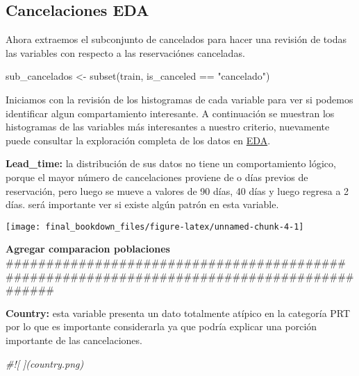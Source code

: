 \documentclass[
]{book}
\newenvironment{Shaded}{\begin{snugshade}}{\end{snugshade}}
\newcommand{\CommentTok}[1]{\textcolor[rgb]{0.56,0.35,0.01}{\textit{#1}}}
\newcommand{\FunctionTok}[1]{\textcolor[rgb]{0.00,0.00,0.00}{#1}}
\newcommand{\NormalTok}[1]{#1}
\newcommand{\OtherTok}[1]{\textcolor[rgb]{0.56,0.35,0.01}{#1}}
\newcommand{\SpecialCharTok}[1]{\textcolor[rgb]{0.00,0.00,0.00}{#1}}
\newcommand{\StringTok}[1]{\textcolor[rgb]{0.31,0.60,0.02}{#1}}
\begin{document}
\hypertarget{cancelaciones-eda}{%
\subsection{Cancelaciones EDA}\label{cancelaciones-eda}}

Ahora extraemos el subconjunto de cancelados para hacer una revisión de todas las variables con respecto a las reservaciónes canceladas.

\begin{Shaded}
\begin{Highlighting}[]
\NormalTok{sub\_cancelados }\OtherTok{\textless{}{-}} \FunctionTok{subset}\NormalTok{(train, is\_canceled }\SpecialCharTok{==} \StringTok{"cancelado"}\NormalTok{)}
\end{Highlighting}
\end{Shaded}

Iniciamos con la revisión de los histogramas de cada variable para ver si podemos identificar algun compartamiento interesante. A continuación se muestran los histogramas de las variables más interesantes a nuestro criterio, nuevamente puede consultar la exploración completa de los datos en \href{https://github.com/marcoyel21/hotel_cancelation_ML21/blob/main/final/EDA_Cancelaciones.Rmd}{EDA}.

\textbf{Lead\_time:} la distribución de sus datos no tiene un comportamiento lógico, porque el mayor número de cancelaciones proviene de o días previos de reservación, pero luego se mueve a valores de 90 días, 40 días y luego regresa a 2 días. será importante ver si existe algún patrón en esta variable.

\begin{center}\texttt{[image: final\_bookdown\_files/figure-latex/unnamed-chunk-4-1]} \end{center}

\textbf{Agregar comparacion poblaciones} \#\#\#\#\#\#\#\#\#\#\#\#\#\#\#\#\#\#\#\#\#\#\#\#\#\#\#\#\#\#\#\#\#\#\#\#\#\#\#\#\#\#
\#\#\#\#\#\#\#\#\#\#\#\#\#\#\#\#\#\#\#\#\#\#\#\#\#\#\#\#\#\#\#\#\#\#\#\#\#\#\#\#\#\#\#\#\#\#\#\#\#

\textbf{Country:} esta variable presenta un dato totalmente atípico en la categoría PRT por lo que es importante considerarla ya que podría explicar una porción importante de las cancelaciones.

\begin{Shaded}
\begin{Highlighting}[]
\CommentTok{\#![ ](country.png) }
\end{Highlighting}
\end{Shaded}
\end{document}

